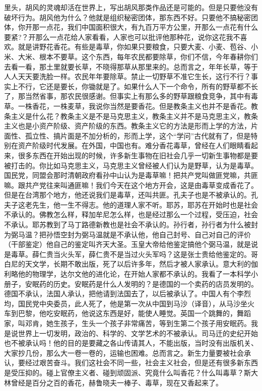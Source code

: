 \documentclass[cn,11pt,chinese]{elegantbook}
\begin{document}
里头，胡风的灵魂却活在世界上，写出胡风那类作品还是可能的。但是只要他没有破坏行为。胡风他为什么？他就是组织秘密团体，那东西不好。只要他不搞秘密团体，你开那一点花，我们中国面积很大，有九百万平方公里，开那么一点花有什么要紧?？开那么一点花给人家看看，人家也可以批评他那种花，说你这花我不喜欢。就是讲野花香花。有些是毒草，你如果只要粮食，只要大麦、小麦、苞谷、小米、大米、根本不要草。这个东西，每年农民都要除草，你们不信，今年春耕你们去看一看，那土里就要长草，不晓得那草从那里来的。总而言之，年年长草，等于人人天天要洗脸一样。农民年年要除草。禁止一切野草不准它生长，这行不行？事实上不行，它还是要长，你锄就是了。如果什么人下一个命令，所有的野草都不长了，那当然省事，那农民很感谢。但事实上有那么多的野草跟粮食竞争，其中有毒草。一株香花，一株麦草，我说你当然是要香花。但是教条主义也并不是香花。教条主义是什么花？教条主义是不是马克思主义，教条主义并不是马克思主义，教条主义也是小资产阶级、资产阶级的东西。教条主义它的方法是形而上学的方法，片面性、孤立性、搞片面是不加分析的，形而上学，这个“学问”古代就有了，但是特别在资产阶级时代发展。在外国，中国也有。难分香花毒草，曾经在人们眼睛看起来，很多东西在开始出现的时候，许多新生事物在旧社会几乎一切新生事物都是要被打击的。你比如马克思主义，马克思主义曾经被人们认为是野草，认为是毒草。国民党，同盟会那时清朝政府看孙中山认为是毒草嘛！把共产党叫做匪党嘛，共匪嘛。跟共产党往来叫通匪嘛！我们今天在这个地方开会，这是由毒草变成香花了。但是在台湾那个地方，他还说我们是毒草，还叫共匪。孔夫子也是不被承认的。孔夫子这老先生，他一生不得志。他的道理人家不听。耶苏，耶苏在开始时也是社会不承认的。佛教怎么样，释加牟尼怎么样，也是经过那么一个过程，受压迫，社会不承认。耶苏教到了马丁路德新教也是社会不承认的。孙行者，孙行者为什么被封为弼马温？把孙悟空封为弼马温就是不承认他，他自己封号、自己对自己的评价（干部鉴定）他自己的鉴定叫齐天大圣。玉皇大帝给他鉴定搞他个弼马温，就是说是毒草。薛仁贵当火头军，薛仁贵不是当过火头军吗？这是张士贵给他鉴定的。哥白尼的天文学，长期不敢出版，死了以后许多年，然后才被人家承认。意大利的伽利略他的物理学，达尔文他的进化论，在开始人家都不承认的。我看了一本科学小册子，安眠药的历史。安眠药是什么人发明的？是德国的一个卖药的店员发明的。德国不承认，法国人承认，把他请到法国去了，以后被承认了。中国人有个李烈均，国民党中央委员，此人死了，他是第一次从中国到马沙（译音），从马沙坐火车到巴黎，他吃安眠药，他说这东西是好，能使人睡觉。英国一个跳舞的，舞蹈家，叫邓肯，她生孩子，生头一个孩子非常痛苦，等到生第二个孩子用安眠药。我是说世界上一切发明，政治的、科学的、文学艺术的不被承认。司马迁的史纪开始也不被承认吗！他的目的是要藏之各山传请其人，不能出版，当时没有出版机关、大家抄几份，那么大一卷一卷的，运输也困难。总而言之。新生力量要被社会承认，要经过艰苦奋斗。我们这社会不同一些，社会主义社会，但是还有很多新东西是受压抑的。碰上官僚主义者、碰到顽固派、究竟什么叫香花？什么叫毒草？斯大林曾经是百分之百的香花，赫鲁晓夫一棒子、毒草，现在又香起来了。\\
\end{document}
